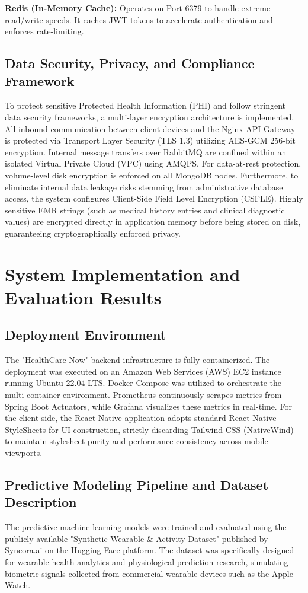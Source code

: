 \documentclass[journal, a4paper]{IEEEtran}
\begin{document}
\textbf{Redis (In-Memory Cache):} Operates on Port 6379 to handle extreme read/write speeds. It caches JWT tokens to accelerate authentication and enforces rate-limiting.

\subsection{Data Security, Privacy, and Compliance Framework}
To protect sensitive Protected Health Information (PHI) and follow stringent data security frameworks, a multi-layer encryption architecture is implemented. All inbound communication between client devices and the Nginx API Gateway is protected via Transport Layer Security (TLS 1.3) utilizing AES-GCM 256-bit encryption. Internal message transfers over RabbitMQ are confined within an isolated Virtual Private Cloud (VPC) using AMQPS. For data-at-rest protection, volume-level disk encryption is enforced on all MongoDB nodes. Furthermore, to eliminate internal data leakage risks stemming from administrative database access, the system configures Client-Side Field Level Encryption (CSFLE). Highly sensitive EMR strings (such as medical history entries and clinical diagnostic values) are encrypted directly in application memory before being stored on disk, guaranteeing cryptographically enforced privacy.

\section{System Implementation and Evaluation Results}
\label{sec:results}

\subsection{Deployment Environment}
The "HealthCare Now" backend infrastructure is fully containerized. The deployment was executed on an Amazon Web Services (AWS) EC2 instance running Ubuntu 22.04 LTS. Docker Compose was utilized to orchestrate the multi-container environment. Prometheus continuously scrapes metrics from Spring Boot Actuators, while Grafana visualizes these metrics in real-time. For the client-side, the React Native application adopts standard React Native StyleSheets for UI construction, strictly discarding Tailwind CSS (NativeWind) to maintain stylesheet purity and performance consistency across mobile viewports.

\subsection{Predictive Modeling Pipeline and Dataset Description}
The predictive machine learning models were trained and evaluated using the publicly available "Synthetic Wearable \& Activity Dataset" published by Syncora.ai on the Hugging Face platform. The dataset was specifically designed for wearable health analytics and physiological prediction research, simulating biometric signals collected from commercial wearable devices such as the Apple Watch. 
\end{document}
